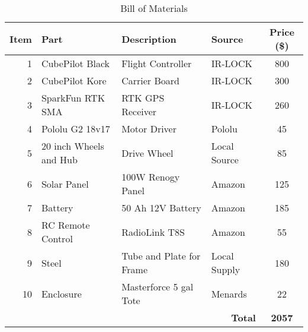 
\begin{table}[!ht]
    \centering
    \caption{Bill of Materials}
    \label{tab:bom}
    \footnotesize
    \begin{tabular}{r l l l c}
        \toprule
        \textbf{Item} & \textbf{Part} & \textbf{Description} & \textbf{Source} & {\textbf{Price (\$)}} \\
        \midrule
        1  & CubePilot Black   & Flight Controller        & IR-LOCK      & 800 \\
        2  & CubePilot Kore    & Carrier Board            & IR-LOCK      & 300 \\
        3  & SparkFun RTK SMA  & RTK GPS Receiver         & IR-LOCK      & 260 \\
        4  & Pololu G2 18v17   & Motor Driver             & Pololu       & 45  \\
        5  & 20 inch Wheels and Hub & Drive Wheel         & Local Source & 85  \\
        6  & Solar Panel       & 100W Renogy Panel        & Amazon       & 125 \\
        7  & Battery           & 50 Ah 12V Battery        & Amazon       & 185 \\
        8  & RC Remote Control & RadioLink T8S            & Amazon       & 55  \\
        9  & Steel             & Tube and Plate for Frame & Local Supply & 180 \\
        10 & Enclosure         & Masterforce 5 gal Tote   & Menards      & 22  \\
        \midrule
        \multicolumn{4}{r}{\textbf{Total}} & {\bfseries 2057} \\
        \bottomrule
    \end{tabular}
\end{table}